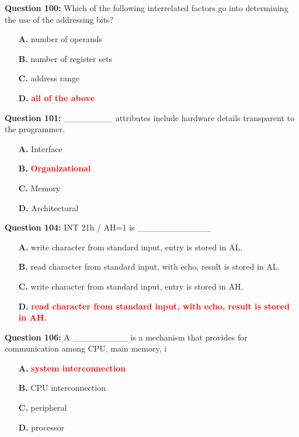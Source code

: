 \documentclass[12pt,a4paper]{article}
\begin{document}
\vspace{0.5cm}

\textbf{Question 100:} Which of the following interrelated factors go into determining the use of the addressing bits?

\begin{itemize}
    \item[\textbf{A.}] number of operands
    \item[\textbf{B.}] number of register sets
    \item[\textbf{C.}] address range
    \item[\textbf{D.}] \textcolor{red}{\textbf{all of the above}}
\end{itemize}

\vspace{0.5cm}

\textbf{Question 101:} ________ attributes include hardware details transparent to the programmer.

\begin{itemize}
    \item[\textbf{A.}] Interface
    \item[\textbf{B.}] \textcolor{red}{\textbf{Organizational}}
    \item[\textbf{C.}] Memory
    \item[\textbf{D.}] Architectural
\end{itemize}

\vspace{0.5cm}

\textbf{Question 104:} INT 21h / AH=1 is ____________

\begin{itemize}
    \item[\textbf{A.}] write character from standard input, entry is stored in AL.
    \item[\textbf{B.}] read character from standard input, with echo, result is stored in AL.
    \item[\textbf{C.}] write character from standard input, entry is stored in AH.
    \item[\textbf{D.}] \textcolor{red}{\textbf{read character from standard input, with echo, result is stored in AH.}}
\end{itemize}

\vspace{0.5cm}

\textbf{Question 106:} A _________ is a mechanism that provides for communication among CPU, main memory, i

\begin{itemize}
    \item[\textbf{A.}] \textcolor{red}{\textbf{system interconnection}}
    \item[\textbf{B.}] CPU interconnection
    \item[\textbf{C.}] peripheral
    \item[\textbf{D.}] processor
\end{itemize}
\end{document}
